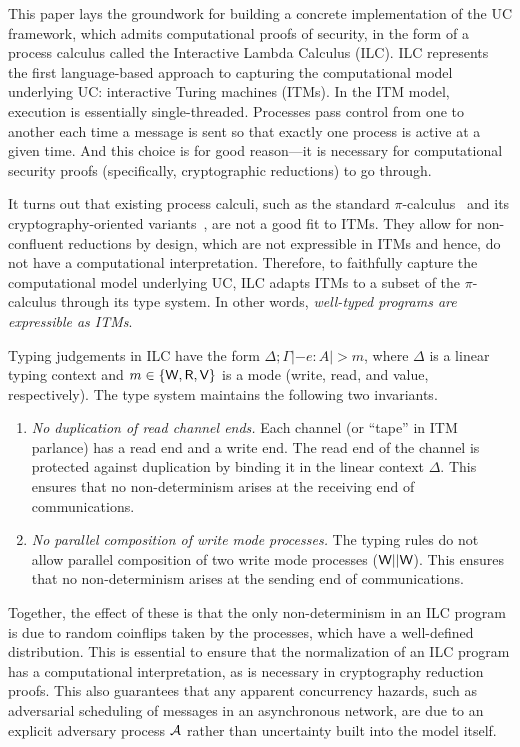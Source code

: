 This paper lays the groundwork for building a concrete implementation of the UC
framework, which admits computational proofs of security, in the form of a
process calculus called the Interactive Lambda Calculus (ILC). ILC represents
the first language-based approach to capturing the computational model
underlying UC: interactive Turing machines (ITMs). In the ITM model, execution
is essentially single-threaded. Processes pass control from one to another each
time a message is sent so that exactly one process is active at a given
time. And this choice is for good reason---it is necessary for computational
security proofs (specifically, cryptographic reductions) to go through.

It turns out that existing process calculi, such as the standard
$\pi$-calculus~\cite{milner1999communicating} and its cryptography-oriented
variants~\cite{abadi1999calculus, abadi2001mobile}, are not a good fit to
ITMs. They allow for non-confluent reductions by design, which are not
expressible in ITMs and hence, do not have a computational interpretation.
Therefore, to faithfully capture the computational model underlying UC, ILC
adapts ITMs to a subset of the $\pi$-calculus through its type system. In other
words, \emph{well-typed programs are expressible as ITMs}.

Typing judgements in ILC have the form $\Delta ; \Gamma |- e : A |> m$, where $\Delta$ is a
linear typing context and $m \in \{\textsf{W}, \textsf{R}, \textsf{V}\}$ is a mode (write, read, and
value, respectively). The type system maintains the following two invariants.
\begin{enumerate}[leftmargin=*]
\item \emph{No duplication of read channel ends.} Each channel (or ``tape'' in
  ITM parlance) has a read end and a write end. The read end of the channel is
  protected against duplication by binding it in the linear context $\Delta$. This
  ensures that no non-determinism arises at the receiving end of communications.

\item \emph{No parallel composition of write mode processes.} The typing rules
  do not allow parallel composition of two write mode processes ($\textsf{W} ||
  \textsf{W}$). This ensures that no non-determinism arises at the sending end of
  communications.
\end{enumerate}

Together, the effect of these is that the only non-determinism in an ILC program
is due to random coinflips taken by the processes, which have a well-defined
distribution. This is essential to ensure that the normalization of an ILC
program has a computational interpretation, as is necessary in cryptography
reduction proofs. This also guarantees that any apparent concurrency hazards,
such as adversarial scheduling of messages in an asynchronous network, are due
to an explicit adversary process $\mathcal{{A}}$ rather than uncertainty built into the
model itself.

